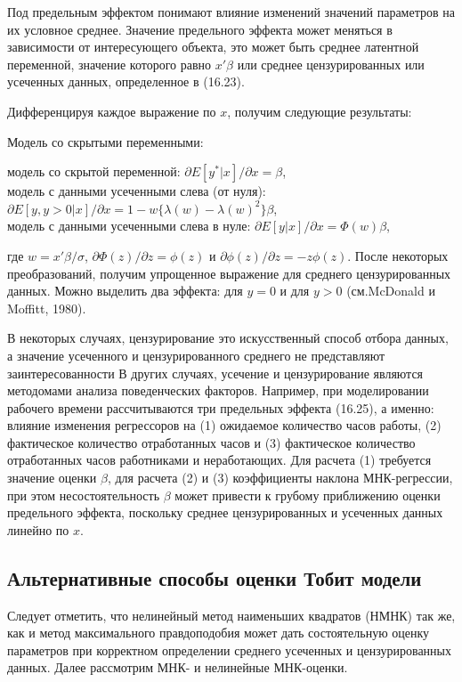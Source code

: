 Под предельным эффектом понимают влияние изменений значений параметров на их условное среднее. Значение предельного эффекта может меняться в зависимости от интересующего объекта, это может быть среднее латентной переменной, значение которого равно $x'\beta$ или среднее цензурированных или усеченных данных, определенное в (16.23).

Дифференцируя каждое выражение по $x$, получим следующие результаты:

Модель со скрытыми переменными: 


модель со скрытой переменной: $\partial E[y^{*}|x]/{\partial{x}}=\beta$, \\
модель с данными усеченными слева (от нуля): $\partial{E}[y,y>0|x]/{\partial}x={1-w\lbrace\lambda}(w)-\lambda(w)^2\rbrace\beta$, \\
модель с данными усеченными слева в нуле: $\partial E[y|x]/\partial x=\Phi(w)\beta$, 



где $w=x'\beta/\sigma$, $\partial\Phi(z)/\partial{z}=\phi(z)$ и $\partial\phi(z)/\partial{z}=-z\phi{(z)}$. После некоторых преобразований, получим упрощенное выражение для среднего цензурированных данных. Можно выделить два эффекта: для $y=0$ и для $y>0$ (см.McDonald и Moffitt, 1980).

В некоторых случаях, цензурирование это искусственный способ отбора данных, а значение усеченного и цензурированного среднего не представляют заинтересованности 
В других случаях, усечение и цензурирование являются методомами анализа поведенческих факторов. Например, при моделировании рабочего времени рассчитываются три предельных эффекта (16.25), а именно: влияние изменения регрессоров на (1) ожидаемое количество часов работы, (2) фактическое количество отработанных часов и (3) фактическое количество отработанных часов работниками и неработающих. Для расчета (1) требуется значение оценки $\beta$, для расчета (2) и (3) коэффициенты наклона МНК-регрессии, при этом несостоятельность $\beta$ может привести к грубому приближению оценки предельного эффекта, поскольку среднее цензурированных и усеченных данных линейно по $x$.

\subsection{Альтернативные способы оценки Тобит модели}

Следует отметить, что нелинейный метод наименьших квадратов (НМНК) так же, как и метод максимального правдоподобия может дать состоятельную оценку параметров при корректном определении среднего усеченных и цензурированных данных. Далее рассмотрим МНК- и нелинейные МНК-оценки.

